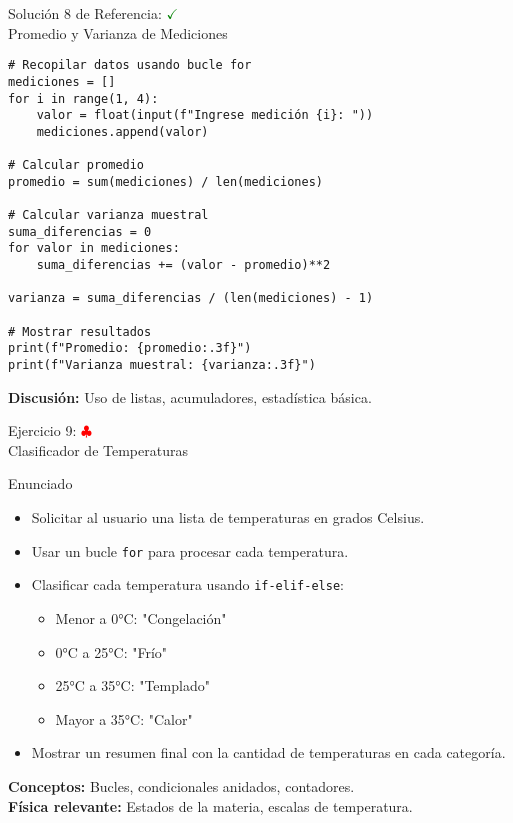 \documentclass[10pt]{beamer}
\begin{document}
\begin{frame}[fragile]{Solución 8 de Referencia: \hfill \textcolor{green}{$\checkmark$} \\ Promedio y Varianza de Mediciones}
\begin{verbatim}
# Recopilar datos usando bucle for
mediciones = []
for i in range(1, 4):
    valor = float(input(f"Ingrese medición {i}: "))
    mediciones.append(valor)

# Calcular promedio
promedio = sum(mediciones) / len(mediciones)

# Calcular varianza muestral
suma_diferencias = 0
for valor in mediciones:
    suma_diferencias += (valor - promedio)**2

varianza = suma_diferencias / (len(mediciones) - 1)

# Mostrar resultados
print(f"Promedio: {promedio:.3f}")
print(f"Varianza muestral: {varianza:.3f}")
\end{verbatim}
\textbf{Discusión:} Uso de listas, acumuladores, estadística básica.
\end{frame}

\begin{frame}{Ejercicio 9: \hfill \textcolor{red}{$\clubsuit$} \\ Clasificador de Temperaturas}
  \begin{block}{Enunciado}
    \begin{itemize}
      \item Solicitar al usuario una lista de temperaturas en grados Celsius.
      \item Usar un bucle \texttt{for} para procesar cada temperatura.
      \item Clasificar cada temperatura usando \texttt{if-elif-else}:
        \begin{itemize}
          \item Menor a 0°C: "Congelación"
          \item 0°C a 25°C: "Frío"
          \item 25°C a 35°C: "Templado"
          \item Mayor a 35°C: "Calor"
        \end{itemize}
      \item Mostrar un resumen final con la cantidad de temperaturas en cada categoría.
    \end{itemize}
  \end{block}
  
  \textbf{Conceptos:} Bucles, condicionales anidados, contadores.
  \\
  \textbf{Física relevante:} Estados de la materia, escalas de temperatura.
\end{frame}
\end{document}
